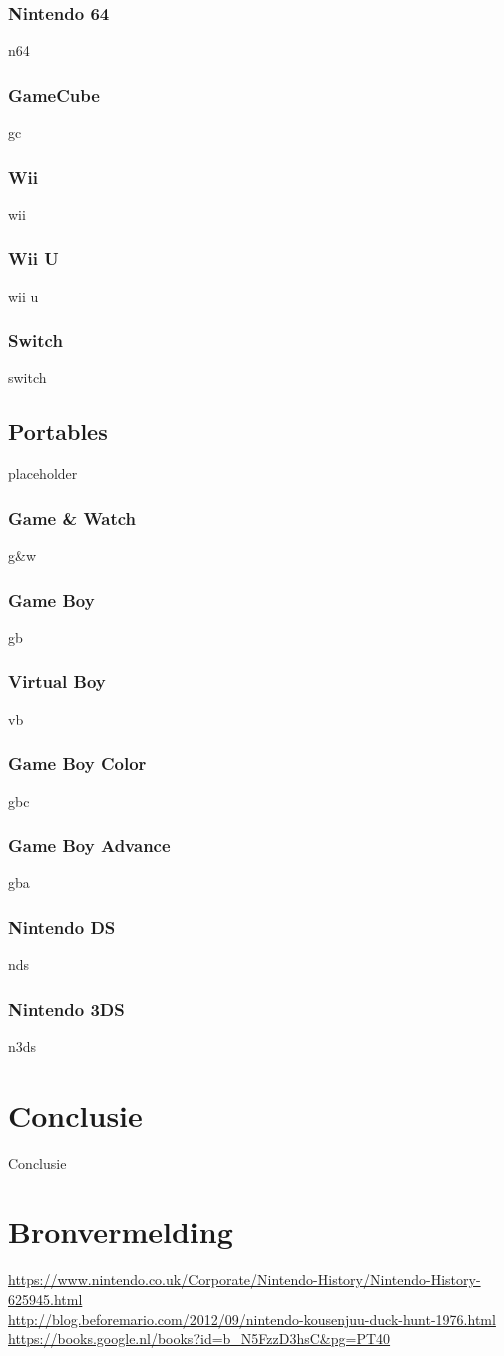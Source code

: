\documentclass{article}
\begin{document}
\subsubsection{Nintendo 64}
n64
\subsubsection{GameCube}
gc
\subsubsection{Wii}
wii
\subsubsection{Wii U}
wii u
\subsubsection{Switch}
switch

\subsection{Portables}
placeholder
\subsubsection{Game \& Watch}
g\&w
\subsubsection{Game Boy}
gb
\subsubsection{Virtual Boy}
vb
\subsubsection{Game Boy Color}
gbc
\subsubsection{Game Boy Advance}
gba
\subsubsection{Nintendo DS}
nds
\subsubsection{Nintendo 3DS}
n3ds
\section{Conclusie}
Conclusie
\section{Bronvermelding}
\url{https://www.nintendo.co.uk/Corporate/Nintendo-History/Nintendo-History-625945.html}\\ 
\url{http://blog.beforemario.com/2012/09/nintendo-kousenjuu-duck-hunt-1976.html}\\ 
\url{https://books.google.nl/books?id=b_N5FzzD3hsC&pg=PT40}\\ 
\end{document}
